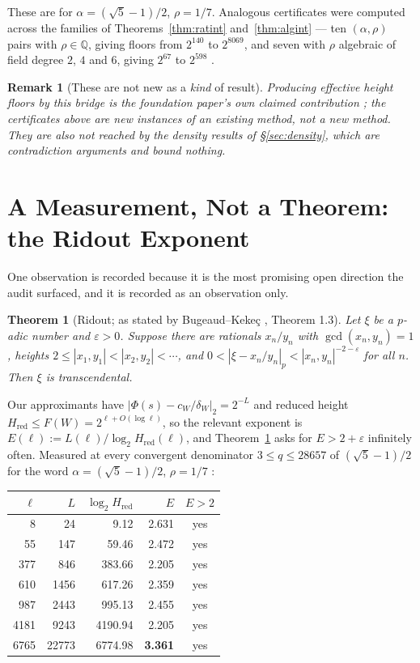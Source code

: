 \documentclass[11pt]{article}
\newtheorem{theorem}{Theorem}[section]
\newtheorem*{remark}{Remark}
\newcommand{\Q}{\mathbb{Q}}
\newcommand{\cw}{c_W}
\begin{document}
These are for $\alpha=(\sqrt5-1)/2$, $\rho=1/7$. Analogous certificates were computed across the
families of Theorems~\ref{thm:ratint} and~\ref{thm:algint} --- ten $(\alpha,\rho)$ pairs with
$\rho\in\Q$, giving floors from $2^{140}$ to $2^{8069}$, and seven with $\rho$ algebraic of field
degree $2$, $4$ and $6$, giving $2^{67}$ to $2^{598}$ \cite{Phase12Quad,Phase13Alg}.

\begin{remark}[These are not new as a \emph{kind} of result]
Producing effective height floors by this bridge is the foundation paper's own claimed contribution
\cite{DeJesus2026Sturmian}; the certificates above are new instances of an existing method, not a new
method. They are also not reached by the density results of \S\ref{sec:density}, which are
contradiction arguments and bound nothing.
\end{remark}

\section{A Measurement, Not a Theorem: the Ridout Exponent}
\label{sec:ridout}

One observation is recorded because it is the most promising open direction the audit surfaced, and
it is recorded as an observation only.

\begin{theorem}[Ridout; as stated by Bugeaud--Keke\c{c} \cite{BugeaudKekec}, Theorem 1.3]
\label{thm:ridout}
Let $\xi$ be a $p$-adic number and $\varepsilon>0$. Suppose there are rationals $x_n/y_n$ with
$\gcd(x_n,y_n)=1$, heights $2\le|x_1,y_1|<|x_2,y_2|<\cdots$, and
$0<|\xi-x_n/y_n|_p<|x_n,y_n|^{-2-\varepsilon}$ for all $n$. Then $\xi$ is transcendental.
\end{theorem}

Our approximants have $|\Phi(s)-\cw/\delta_W|_2=2^{-L}$ and reduced height $H_{\mathrm{red}}\le
F(W)=2^{\ell+O(\log\ell)}$, so the relevant exponent is
$E(\ell):=L(\ell)/\log_2H_{\mathrm{red}}(\ell)$, and Theorem~\ref{thm:ridout} asks for
$E>2+\varepsilon$ infinitely often. Measured at every convergent denominator
$3\le q\le28657$ of $(\sqrt5-1)/2$ for the word $\alpha=(\sqrt5-1)/2$, $\rho=1/7$
\cite{Phase13Ridout}:

\begin{center}
\begin{tabular}{@{}rrrrc@{}}
\toprule
$\ell$ & $L$ & $\log_2H_{\mathrm{red}}$ & $E$ & $E>2$ \\
\midrule
8 & 24 & 9.12 & 2.631 & yes \\
55 & 147 & 59.46 & 2.472 & yes \\
377 & 846 & 383.66 & 2.205 & yes \\
610 & 1456 & 617.26 & 2.359 & yes \\
987 & 2443 & 995.13 & 2.455 & yes \\
4181 & 9243 & 4190.94 & 2.205 & yes \\
6765 & 22773 & 6774.98 & \textbf{3.361} & yes \\
\bottomrule
\end{tabular}
\end{center}
\end{document}
